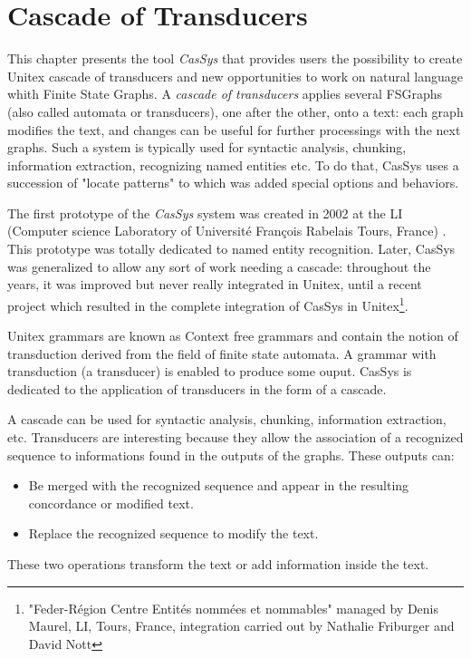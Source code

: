 \chapter{Cascade of Transducers}
\label{chap-cassys}

This chapter presents the tool \textit{CasSys} that provides users the possibility to create Unitex cascade of transducers and new opportunities to work on natural language whith Finite State Graphs. A \textit{cascade of transducers}  applies several FSGraphs (also called automata or transducers), one after the other, onto a text: each graph modifies the text, and changes can be useful for further processings with the next graphs. Such a system is typically used for syntactic analysis, chunking, information extraction, recognizing named entities etc. To do that, CasSys uses a succession of "locate patterns" to which was added special options and behaviors.

\bigskip
\noindent The first prototype of the \textit{CasSys}  system was created in 2002 at the LI 
(Computer science Laboratory of Université François Rabelais Tours, France) \cite{these-nathalie}. This prototype was totally  dedicated to named entity recognition. Later, CasSys was generalized to allow any sort of work needing a cascade: throughout the years,  it was improved but never really integrated in Unitex, until a recent project which resulted in the complete integration of CasSys in Unitex\footnote{"Feder-Région Centre Entités  nommées et nommables" managed by Denis Maurel, LI, Tours, France, integration carried out by Nathalie Friburger and David Nott}.


Unitex grammars are known as Context free grammars and contain the notion of transduction derived from the field 
of finite state automata. A grammar with transduction (a transducer) is enabled to produce some ouput. 
CasSys is dedicated to the application of transducers in the form of a cascade.

\bigskip
A cascade can be used for syntactic analysis, chunking, information extraction, etc. 
\noindent Transducers are interesting because they allow the association of a recognized sequence to informations found in the outputs of the graphs. 
These outputs can:
\begin{itemize}
	\item	Be merged with the recognized sequence and appear in the resulting concordance or modified text. 
	\item	Replace the recognized sequence to modify the text. 
\end{itemize}
\noindent These two operations transform the text or add information inside the text. 


